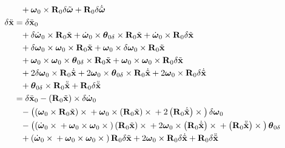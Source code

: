 \documentclass[10pt,dvips,fleqn,subeqn]{report}
\newcommand{\T}[1]{\bm{\mathbf{#1}}}
\newcommand{\TT}[1]{\bm{\mathbf{#1}}}
\begin{document}
\begin{subequations}
\begin{align}
		\nonumber \\
		&\hphantom{=}+ \T{\omega}_0 \times \TT{R}_0 \delta\tilde{\T{\omega}}
		+ \TT{R}_0 \delta\dot{\tilde{\T{\omega}}} \\
	\delta\ddot{\T{x}} &= \delta\ddot{\T{x}}_0
		\nonumber \\
		&\hphantom{=}+ \delta\dot{\T{\omega}}_0 \times \TT{R}_0 \tilde{\T{x}}
		+ \dot{\T{\omega}}_0 \times \T{\theta}_{0\delta}\times\TT{R}_0 \tilde{\T{x}}
		+ \dot{\T{\omega}}_0 \times \TT{R}_0 \delta\tilde{\T{x}}
		\nonumber \\
		&\hphantom{=}+ \delta\T{\omega}_0 \times \T{\omega}_0 \times \TT{R}_0 \tilde{\T{x}}
		+ \T{\omega}_0 \times \delta\T{\omega}_0 \times \TT{R}_0 \tilde{\T{x}}
		\nonumber \\
		&\hphantom{=}+ \T{\omega}_0 \times \T{\omega}_0 \times \T{\theta}_{0\delta}\times\TT{R}_0 \tilde{\T{x}}
		+ \T{\omega}_0 \times \T{\omega}_0 \times \TT{R}_0 \delta\tilde{\T{x}}
		\nonumber \\
		&\hphantom{=}+ 2 \delta\T{\omega}_0 \times \TT{R}_0 \dot{\tilde{\T{x}}}
		+ 2 \T{\omega}_0 \times \T{\theta}_{0\delta}\times\TT{R}_0 \dot{\tilde{\T{x}}}
		+ 2 \T{\omega}_0 \times \TT{R}_0 \delta\dot{\tilde{\T{x}}}
		\nonumber \\
		&\hphantom{=}+ \T{\theta}_{0\delta}\times\TT{R}_0 \ddot{\tilde{\T{x}}}
		+ \TT{R}_0 \delta\ddot{\tilde{\T{x}}}
		\nonumber \\
	&= \delta\ddot{\T{x}}_0 - \plbr{\TT{R}_0 \tilde{\T{x}}} \times \delta\dot{\T{\omega}}_0
		\nonumber \\
		&\hphantom{=}- \plbr{
			\plbr{\T{\omega}_0 \times \TT{R}_0 \tilde{\T{x}}} \times{}
			+ \T{\omega}_0 \times \plbr{\TT{R}_0 \tilde{\T{x}}} \times{}
			+ 2 \plbr{\TT{R}_0 \dot{\tilde{\T{x}}}} \times{}
		} \delta\T{\omega}_0
		\nonumber \\
		&\hphantom{=}- \plbr{
			\plbr{
				\dot{\T{\omega}}_0 \times{}
				+ \T{\omega}_0 \times \T{\omega}_0 \times{}
			} \plbr{\TT{R}_0 \tilde{\T{x}}} \times{}
			+ 2 \T{\omega}_0 \times \plbr{\TT{R}_0 \dot{\tilde{\T{x}}}} \times{}
			+ \plbr{\TT{R}_0 \ddot{\tilde{\T{x}}}} \times{}
		}\T{\theta}_{0\delta}
		\nonumber \\
		&\hphantom{=}+ \plbr{
			\dot{\T{\omega}}_0 \times{}
			+ \T{\omega}_0 \times \T{\omega}_0 \times{}
		} \TT{R}_0 \delta\tilde{\T{x}}
%
		+ 2 \T{\omega}_0 \times \TT{R}_0 \delta\dot{\tilde{\T{x}}}
%
		+ \TT{R}_0 \delta\ddot{\tilde{\T{x}}}
\end{align}
\end{subequations}
\end{document}
